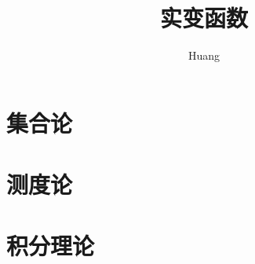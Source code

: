 \documentclass[lang=cn,14pt]{elegantbook}
\title{实变函数}
\author{ Huang}
\begin{document}
	
	\maketitle
	\frontmatter
	
	\tableofcontents
	
	\mainmatter
	\chapter{集合论}
	\chapter{测度论}
	\chapter{积分理论}
\end{document}
